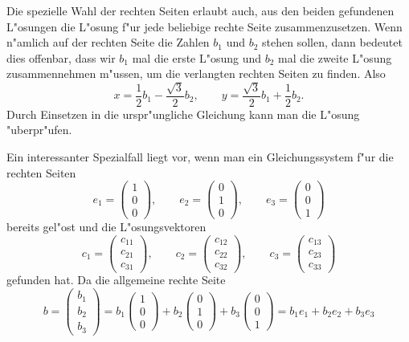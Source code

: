 Die spezielle Wahl der rechten Seiten erlaubt auch, aus den
beiden gefundenen L"osungen die L"osung f"ur jede beliebige rechte
Seite zusammenzusetzen. Wenn n"amlich auf der rechten
Seite die Zahlen $b_1$ und $b_2$ stehen sollen, dann
bedeutet dies offenbar, dass wir $b_1$ mal die erste L"osung
und $b_2$ mal die zweite L"osung zusammennehmen m"ussen, um
die verlangten rechten Seiten zu finden.
Also
\[
x=\frac12b_1-\frac{\sqrt{3}}2b_2,\qquad y=\frac{\sqrt{3}}2b_1+\frac12b_2.
\]
Durch Einsetzen in die urspr"ungliche Gleichung kann man die
L"osung "uberpr"ufen.

Ein interessanter Spezialfall liegt vor, wenn man ein Gleichungssystem
f"ur die rechten Seiten 
\[
e_1=\begin{pmatrix}1\\0\\0\end{pmatrix},\qquad
e_2=\begin{pmatrix}0\\1\\0\end{pmatrix},\qquad
e_3=\begin{pmatrix}0\\0\\1\end{pmatrix}
\]
bereits gel"ost und die L"osungsvektoren
\[
c_1=\begin{pmatrix} c_{11}\\ c_{21}\\ c_{31} \end{pmatrix},\qquad
c_2=\begin{pmatrix} c_{12}\\ c_{22}\\ c_{32} \end{pmatrix},\qquad
c_3=\begin{pmatrix} c_{13}\\ c_{23}\\ c_{33} \end{pmatrix}
\]
gefunden hat.
Da die allgemeine rechte Seite
\[
b=\begin{pmatrix}
b_1\\b_2\\b_3
\end{pmatrix}
=
b_1 \begin{pmatrix}1\\0\\0\end{pmatrix}
+
b_2 \begin{pmatrix}0\\1\\0\end{pmatrix}
+
b_3 \begin{pmatrix}0\\0\\1\end{pmatrix}
=
b_1 e_1 + b_2 e_2 + b_3 e_3
\]
